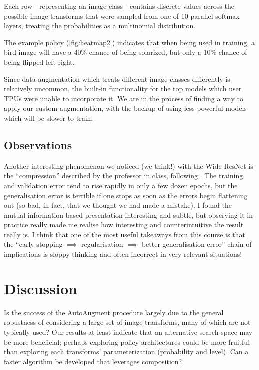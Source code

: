 \documentclass[10pt,twocolumn,letterpaper]{article}
\begin{document}
    Each row - representing an image class - contains discrete values across the possible image transforms that were sampled from one of 10 parallel softmax layers, treating the probabilities as a multinomial distribution.
		
    The example policy (\autoref{fig:heatmap2}) indicates that when being used in training, a bird image will have a 40\% chance of being solarized, but only a 10\% chance of being flipped left-right.
		
    Since data augmentation which treats different image classes differently is relatively uncommon, the built-in functionality for the top models which user TPUs were unable to incorporate it. We are in the process of finding a way to apply our custom augmentation, with the backup of using less powerful models which will be slower to train.

  \subsection{Observations}
	
    Another interesting phenomenon we noticed (we think!) with the Wide ResNet is the ``compression'' described by the professor in class, following \cite{Shwartz-Ziv2017}. The training and validation error tend to rise rapidly in only a few dozen epochs, but the generalisation error is terrible if one stops as soon as the errors begin flattening out (so bad, in fact, that we thought we had made a mistake). I found the mutual-information-based presentation interesting and subtle, but observing it in practice really made me realise how interesting and counterintuitive the result really is. I think that one of the most useful takeaways from this course is that the ``early stopping $\implies$ regularisation $\implies$ better generalisation error'' chain of implications is sloppy thinking and often incorrect in very relevant situations!

\section{Discussion}
  Is the success of the AutoAugment procedure largely due to the general robustness of considering a large set of image transforms, many of which are not typically used? Our results at least indicate that an alternative search space may be more beneficial; perhaps exploring policy architectures could be more fruitful than exploring each transforms' parameterization (probability and level). Can a faster algorithm be developed that leverages composition?
\end{document}
